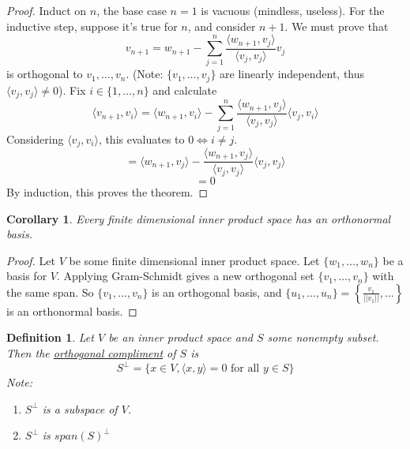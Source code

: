 \documentclass{article}
\newtheorem{definition}[theorem]{Definition}
\newtheorem{corollary}[theorem]{Corollary}
\newtheorem{one minute paper}[theorem]{One Minute Paper}
\begin{document}
\begin{proof}
    Induct on $n$, the base case $n=1$ is vacuous (mindless, useless). For the inductive step, suppose it's true for $n$, and consider $n+1$. We must prove that 
    \begin{equation}
        v_{n+1} = w_{n+1} - \sum_{j=1}^{n}\frac{\langle w_{n+1}, v_j \rangle }{\langle v_j, v_j \rangle}v_j
    \end{equation}
    is orthogonal to $v_1, \dots, v_n$. (Note: $\{v_1,\dots,v_j\}$ are linearly independent, thus $\langle v_j, v_j \rangle \neq 0$). Fix $i \in \{1,\dots, n\}$ and calculate 
    \begin{equation}
        \langle v_{n+1}, v_i \rangle  = \langle w_{n+1}, v_i \rangle - \sum_{j=1}^{n}\frac{\langle w_{n+1}, v_j \rangle}{\langle v_j, v_j \rangle}\langle v_j, v_i \rangle 
    \end{equation}
    Considering $\langle v_j, v_i \rangle$, this evaluates to $0 \iff i \neq j$. 
    \begin{equation}
        = \langle w_{n+1}, v_j \rangle - \frac{\langle w_{n+1}, v_j\rangle }{\langle v_j, v_j \rangle}\langle v_j,v_j \rangle
    \end{equation}
    \begin{equation}
        = 0
    \end{equation}
    By induction, this proves the theorem. 
\end{proof}

\begin{corollary}
    Every finite dimensional inner product space has an orthonormal basis. 
\end{corollary}

\begin{proof}
    Let $V$ be some finite dimensional inner product space. Let $\{w_1,\dots,w_n\}$ be a basis for $V$. Applying Gram-Schmidt gives a new orthogonal set $\{v_1, \dots, v_n\}$ with the same span. 
    So $\{v_1, \dots, v_n\}$ is an orthogonal basis, and $\{u_1,\dots,u_n\} = \left\{\frac{v_1}{||v_1||}, \dots\right\}$ is an orthonormal basis. 
\end{proof}

\begin{definition}
    Let $V$ be an inner product space and $S$ some nonempty subset. Then the \underline{orthogonal compliment} of $S$ is 
    \begin{equation}
        S^{\perp} = \{x \in V, \langle x,y \rangle = 0 \text{ for all } y \in S\}
    \end{equation}
    Note:
    \begin{enumerate}
        \item $S^{\perp}$ is a subspace of $V$. 
        \item $S^{\perp}$ is $span(S)^{\perp}$
    \end{enumerate}
\end{definition}
\end{document}
